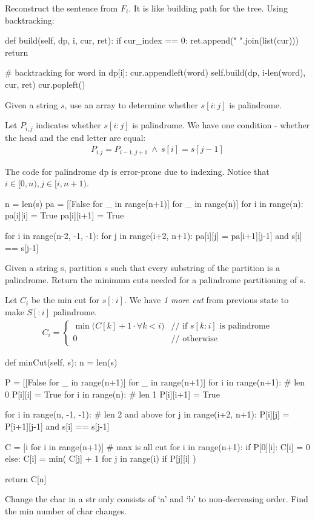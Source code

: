 Reconstruct the sentence from $F_i$. It is like building path for the tree. Using backtracking: 
\begin{python}
def build(self, dp, i, cur, ret):
    if cur_index == 0:
        ret.append(" ".join(list(cur)))
        return

    # backtracking
    for word in dp[i]:
        cur.appendleft(word)
        self.build(dp, i-len(word), cur, ret)
        cur.popleft()

\end{python}

 Given a string $s$, use an array to determine whether $s[i:j]$ is palindrome.

Let $P_{i,j}$  indicates whether $s[i:j]$ is palindrome. We have one condition - whether the head and the end letter are equal: 
\begin{eqnarray*}
P_{i. j} = P_{i-1, j+1}\ \wedge\ s[i] = s[j-1]
\end{eqnarray*}

The code for palindrome dp is error-prone due to indexing. Notice that $i \in [0, n), j \in [i, n+1)$.
\begin{python}
n = len(s)
pa = [[False for _ in range(n+1)] for _ in range(n)]
for i in range(n):
    pa[i][i] = True
    pa[i][i+1] = True

for i in range(n-2, -1, -1):
    for j in range(i+2, n+1):
        pa[i][j] = pa[i+1][j-1] and s[i] == s[j-1]
\end{python}
 Given a string s, partition s such that every substring of the partition is a palindrome. Return the minimum cuts needed for a palindrome partitioning of s.

Let $C_i$ be the min cut for $s[:i]$. We have \textit{1 more cut} from previous state to make $S[:i]$ palindrome. 
\begin{eqnarray*}
C_{i} = \left\{ \begin{array}{rl}
  \min\big(C[k]+1 \cdot \forall k<i \big) &\mbox{// if $s[k:i]$ is palindrome}
\\
  0 &\mbox{// otherwise}
       \end{array} \right.
\end{eqnarray*}
\begin{python}
def minCut(self, s):
  n = len(s)

  P = [[False for _ in range(n+1)] for _ in range(n+1)]
  for i in range(n+1):  # len 0
    P[i][i] = True
  for i in range(n):  # len 1
    P[i][i+1] = True

  for i in range(n, -1, -1):  # len 2 and above
    for j in range(i+2, n+1):
      P[i][j] = P[i+1][j-1] and s[i] == s[j-1]

  C = [i for i in range(n+1)]  # max is all cut
  for i in range(n+1):
    if P[0][i]:
      C[i] = 0
    else:
      C[i] = min(
          C[j] + 1
          for j in range(i)
          if P[j][i]
      )

  return C[n]
\end{python}
 Change the char in a str only consists of `a' and `b' to non-decreasing order. Find the min number of char changes. 


